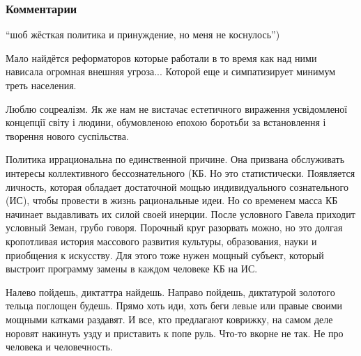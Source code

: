  
 
 
 
 
\subsubsection{Комментарии}
\label{sec:07_06_2021.fb.arestovich_alexei.1.ukraina_razvitie_obschestvo.cmt}
\begin{itemize}


\enquote{шоб жёсткая политика и принуждение, но меня не коснулось})


Мало найдётся реформаторов которые работали в то время как над ними нависала
огромная внешняя угроза... Которой еще и симпатизирует минимум треть населения.


Люблю соцреалізм. Як же нам не вистачає естетичного вираження усвідомленої
концепції світу і людини, обумовленою епохою боротьби за встановлення і
творення нового суспільства.


Политика иррациональна по единственной причине. Она призвана обслуживать
интересы коллективного бессознательного (КБ. Но это статистически. Появляется
личность, которая обладает достаточной мощью индивидуального сознательного
(ИС), чтобы провести в жизнь рациональные идеи. Но со временем масса КБ
начинает выдавливать их силой своей инерции. После условного Гавела приходит
условный Земан, грубо говоря. Порочный круг разорвать можно, но это долгая
кропотливая история массового развития культуры, образования, науки и
приобщения к искусству. Для этого тоже нужен мощный субъект, который выстроит
программу замены в каждом человеке КБ на ИС.


Налево пойдешь, диктаттра найдешь. Направо пойдешь, диктатурой золотого тельца
поглощен будешь. Прямо хоть иди, хоть беги левые или правые своими мощными
катками раздавят.  И все, кто предлагают коврижку, на самом деле норовят
накинуть узду и приставить к попе руль.  Что-то вкорне не так. Не про человека
и человечность.


\end{itemize}
